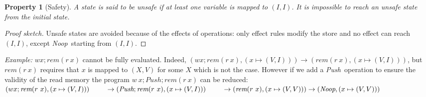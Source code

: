 \documentclass[preprint,12pt]{elsarticle}
\newcommand{\symb}[1]{\textit{#1}}
\newcommand{\noop}{\symb{Noop}}
\newcommand{\Push}{\symb{Push}}
\newcommand{\rem}[1]{\symb{rem}(#1)}
\newtheorem{Property}{Property}
\begin{document}
\begin{Property}[Safety]\label{prop:safe}
A state is said to be \emph{unsafe} if at least one variable is mapped to 
$(I,I)$.
It is impossible to reach an unsafe state from the initial state.
\end{Property}
\begin{proof}[Proof sketch] 
Unsafe states are avoided  because of the effects of operations: 
only effect rules modify the store and no effect can reach $(I,I)$, except 
\noop\ starting from $(I,I)$.
\end{proof}

\noindent
   \emph{Example:} 
    $w x;\rem{r~x}$ cannot be fully evaluated. Indeed, $(w x;\rem{r~x},(x\mapsto 
    (V,I)))\to (\rem{r~x},(x\mapsto (V,I)))$, but  $\rem{r~x}$ requires that $x$ is 
    mapped to $(X,V)$ for some $X$ which is not the case.
However if we add a \Push\ operation to ensure the validity of the read memory the 
program $w~x;Push;\rem{r~x}$ can be reduced:\\
$(w x;\rem{r~x},(x\mapsto (V,I)))\\~\qquad\to (\Push;\rem{r~x},(x\mapsto 
(V,I)))\\~\qquad\to 
(\rem{r~x},(x\mapsto (V,V)))\to (\noop,(x\mapsto (V,V)))$
\end{document}
